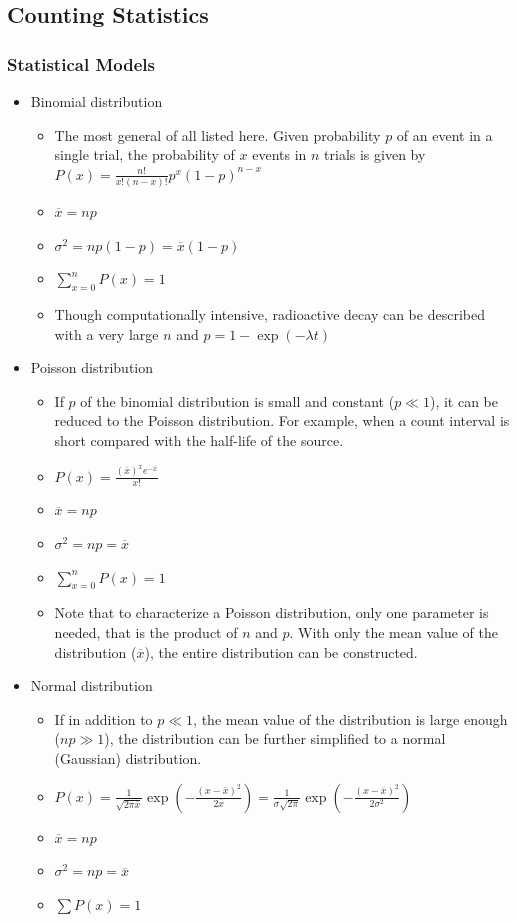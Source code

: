 \subsection{Counting Statistics}
\subsubsection{Statistical Models}
\begin{itemize}
    \item Binomial distribution
    \begin{itemize}
        \item The most general of all listed here. Given probability $p$ of an event in a single trial, the probability of $x$ events in $n$ trials is given by\\
        $P(x)=\frac{n!}{x!(n-x)!}p^x(1-p)^{n-x}$
        \item[] $\overline{x}=np$
        \item[] $\sigma^2=np(1-p)=\overline{x}(1-p)$
        \item[] $\sum_{x=0}^nP(x)=1$
        \item Though computationally intensive, radioactive decay can be described with a very large $n$ and $p=1-\exp(-\lambda t)$
    \end{itemize}
    \item Poisson distribution
    \begin{itemize}
        \item If $p$ of the binomial distribution is small and constant ($p\ll1$), it can be reduced to the Poisson distribution. For example, when a count interval is short compared with the half-life of the source.
        \item[] $P(x)=\frac{(\overline{x})^xe^{-\overline{x}}}{x!}$
        \item[] $\overline{x}=np$
        \item[] $\sigma^2=np=\overline{x}$
        \item[] $\sum_{x=0}^nP(x)=1$
        \item Note that to characterize a Poisson distribution, only one parameter is needed, that is the product of $n$ and $p$. With only the mean value of the distribution ($\overline{x}$), the entire distribution can be constructed.
    \end{itemize}
    \item Normal distribution
    \begin{itemize}
        \item If in addition to $p\ll1$, the mean value of the distribution is large enough ($np\gg1$), the distribution can be further simplified to a normal (Gaussian) distribution.
        \item[] $P(x)=\frac{1}{\sqrt{2\pi\overline{x}}}\exp\left(-\frac{(x-\overline{x})^2}{2\overline{x}}\right)=\frac{1}{\sigma\sqrt{2\pi}}\exp\left(-\frac{(x-\overline{x})^2}{2\sigma^2}\right)$
        \item[] $\overline{x}=np$
        \item[] $\sigma^2=np=\overline{x}$
        \item[] $\sum P(x)=1$
    \end{itemize}
\end{itemize}
